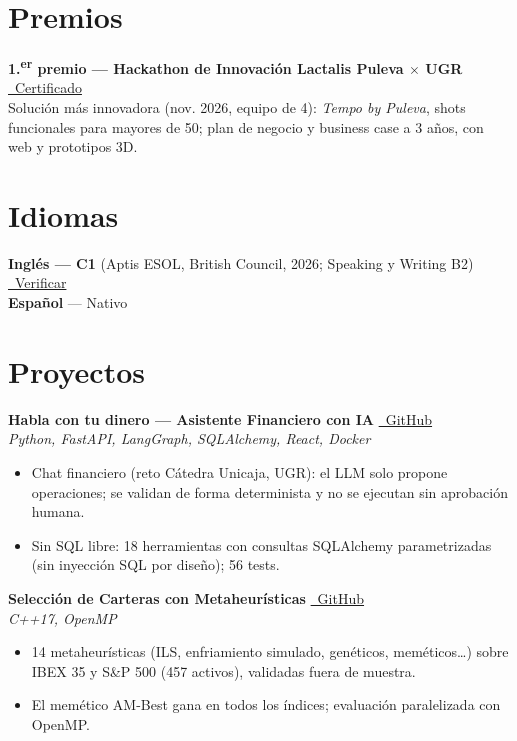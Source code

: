 \documentclass[12pt,a4paper]{article}
\begin{document}
\section{Premios}
\textbf{1.\textsuperscript{er} premio --- Hackathon de Innovación Lactalis Puleva $\times$ UGR} \hfill \href{https://joseangelcarretero.dev/certificado-hackathon-puleva.pdf}{\faCheckCircle\ Certificado} \\
Solución más innovadora (nov. 2026, equipo de 4): \textit{Tempo by Puleva}, shots funcionales para mayores de 50; plan de negocio y business case a 3 años, con web y prototipos 3D.

\section{Idiomas}
\textbf{Inglés --- C1} (Aptis ESOL, British Council, 2026; Speaking y Writing B2) \hfill \href{https://credentials.britishcouncil.org/28379ba7-48f4-48de-9bec-4a27901aebc4?key=904660ccf4df4f33d680e802a8130aace31f119fae33bb6c3fc9628da4798365}{\faCheckCircle\ Verificar} \\
\textbf{Español} --- Nativo

\section{Proyectos}

\textbf{Habla con tu dinero --- Asistente Financiero con IA} \hfill \href{https://github.com/0xjoseangel/reto-unicaja}{\faGithub\ GitHub} \\
\textit{Python, FastAPI, LangGraph, SQLAlchemy, React, Docker}
\begin{itemize}[leftmargin=1.2em,itemsep=1pt,topsep=2pt,parsep=0pt]
  \item Chat financiero (reto Cátedra Unicaja, UGR): el LLM solo propone operaciones; se validan de forma determinista y no se ejecutan sin aprobación humana.
  \item Sin SQL libre: 18 herramientas con consultas SQLAlchemy parametrizadas (sin inyección SQL por diseño); 56 tests.
\end{itemize}

\vspace{3pt}

\textbf{Selección de Carteras con Metaheurísticas} \hfill \href{https://github.com/0xjoseangel/portfolio}{\faGithub\ GitHub} \\
\textit{C++17, OpenMP}
\begin{itemize}[leftmargin=1.2em,itemsep=1pt,topsep=2pt,parsep=0pt]
  \item 14 metaheurísticas (ILS, enfriamiento simulado, genéticos, meméticos\ldots) sobre IBEX 35 y S\&P 500 (457 activos), validadas fuera de muestra.
  \item El memético AM-Best gana en todos los índices; evaluación paralelizada con OpenMP.
\end{itemize}
\end{document}
